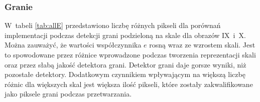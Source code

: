 \subsubsection{Granie}
\label{subsubsec:granieTabele}

W~tabeli \ref{tab:allE} przedstawiono liczbę różnych pikseli dla porównań implementacji podczas detekcji grani podzieloną na skale dla obrazów IX~i~X. Można zauważyć, że wartości współczynnika $ e $ rosną wraz ze wzrostem skali. Jest to spowodowane przez różnice wprowadzone podczas tworzenia reprezentacji skali oraz przez słabą jakość detektora grani. Detektor grani daje gorsze wyniki, niż pozostałe detektory. Dodatkowym czynnikiem wpływającym na większą liczbę różnic dla większych skal jest większa ilość pikseli, które zostały zakwalifikowane jako piksele grani podczas przetwarzania.
